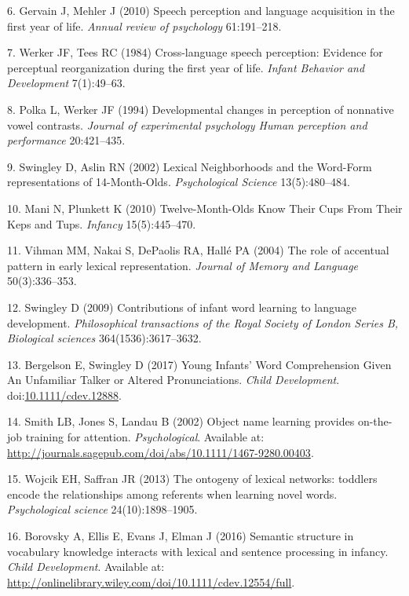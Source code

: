 \documentclass[9pt,twocolumn,twoside,]{pnas-new}
\begin{document}
\hypertarget{ref-Gervain2010}{}
6. Gervain J, Mehler J (2010) Speech perception and language acquisition
in the first year of life. \emph{Annual review of psychology}
61:191--218.

\hypertarget{ref-Werker1984}{}
7. Werker JF, Tees RC (1984) Cross-language speech perception: Evidence
for perceptual reorganization during the first year of life.
\emph{Infant Behavior and Development} 7(1):49--63.

\hypertarget{ref-Polka1994}{}
8. Polka L, Werker JF (1994) Developmental changes in perception of
nonnative vowel contrasts. \emph{Journal of experimental psychology
Human perception and performance} 20:421--435.

\hypertarget{ref-Swingley2002b}{}
9. Swingley D, Aslin RN (2002) Lexical Neighborhoods and the Word-Form
representations of 14-Month-Olds. \emph{Psychological Science}
13(5):480--484.

\hypertarget{ref-Mani2010}{}
10. Mani N, Plunkett K (2010) Twelve-Month-Olds Know Their Cups From
Their Keps and Tups. \emph{Infancy} 15(5):445--470.

\hypertarget{ref-Vihman2004}{}
11. Vihman MM, Nakai S, DePaolis RA, Hallé PA (2004) The role of
accentual pattern in early lexical representation. \emph{Journal of
Memory and Language} 50(3):336--353.

\hypertarget{ref-Swingley2009a}{}
12. Swingley D (2009) Contributions of infant word learning to language
development. \emph{Philosophical transactions of the Royal Society of
London Series B, Biological sciences} 364(1536):3617--3632.

\hypertarget{ref-Bergelson2017a}{}
13. Bergelson E, Swingley D (2017) Young Infants' Word Comprehension
Given An Unfamiliar Talker or Altered Pronunciations. \emph{Child
Development}.
doi:\href{https://doi.org/10.1111/cdev.12888}{10.1111/cdev.12888}.

\hypertarget{ref-Smith2002}{}
14. Smith LB, Jones S, Landau B (2002) Object name learning provides
on-the-job training for attention. \emph{Psychological}. Available at:
\url{http://journals.sagepub.com/doi/abs/10.1111/1467-9280.00403}.

\hypertarget{ref-Wojcik2013a}{}
15. Wojcik EH, Saffran JR (2013) The ontogeny of lexical networks:
toddlers encode the relationships among referents when learning novel
words. \emph{Psychological science} 24(10):1898--1905.

\hypertarget{ref-Borovsky2016}{}
16. Borovsky A, Ellis E, Evans J, Elman J (2016) Semantic structure in
vocabulary knowledge interacts with lexical and sentence processing in
infancy. \emph{Child Development}. Available at:
\url{http://onlinelibrary.wiley.com/doi/10.1111/cdev.12554/full}.
\end{document}
